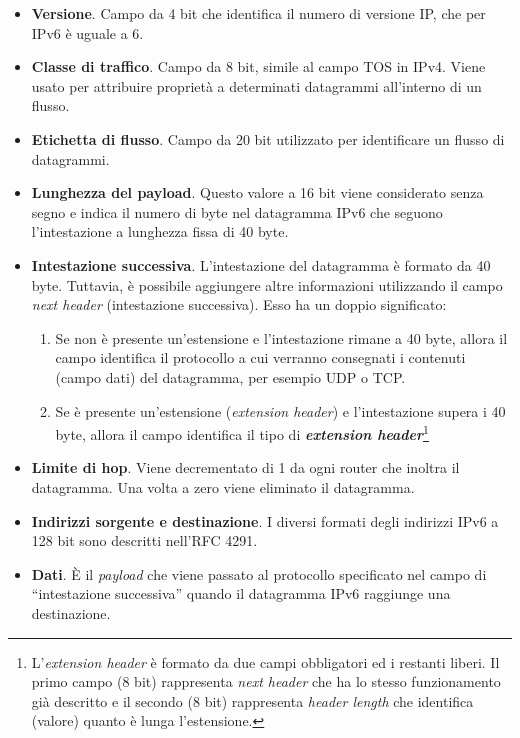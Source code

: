 \documentclass[a4paper]{article}
\newcommand{\dquotes}[1]{``#1''}
\begin{document}
	\begin{itemize}
		\item \textbf{Versione}. Campo da 4 bit che identifica il numero di versione IP, che per IPv6 è uguale a 6.
		
		\item \textbf{Classe di traffico}. Campo da 8 bit, simile al campo \textsf{TOS} in IPv4. Viene usato per attribuire proprietà a determinati datagrammi all'interno di un flusso.
		
		\item \textbf{Etichetta di flusso}. Campo da 20 bit utilizzato per identificare un flusso di datagrammi.
		
		\item \textbf{Lunghezza del payload}. Questo valore a 16 bit viene considerato senza segno e indica il numero di byte nel datagramma IPv6 che seguono l'intestazione a lunghezza fissa di 40 byte.
		
		\item \textbf{Intestazione successiva}. L'intestazione del datagramma è formato da 40 byte. Tuttavia, è possibile aggiungere altre informazioni utilizzando il campo \emph{next header} (intestazione successiva). Esso ha un doppio significato:
		\begin{enumerate}
			\item Se non è presente un'estensione e l'intestazione rimane a 40 byte, allora il campo identifica il protocollo a cui verranno consegnati i contenuti (campo dati) del datagramma, per esempio \textsf{UDP} o \textsf{TCP}.
			
			\item Se è presente un'estensione (\emph{extension header}) e l'intestazione supera i 40 byte, allora il campo identifica il tipo di \textbf{\emph{extension header}}\footnote{L'\emph{extension header} è formato da due campi obbligatori ed i restanti liberi. Il primo campo (8 bit) rappresenta \emph{next header} che ha lo stesso funzionamento già descritto e il secondo (8 bit) rappresenta \emph{header length} che identifica (valore) quanto è lunga l'estensione.}
		\end{enumerate}
		
		\item \textbf{Limite di hop}. Viene decrementato di 1 da ogni router che inoltra il datagramma. Una volta a zero viene eliminato il datagramma.
		
		\item \textbf{Indirizzi sorgente e destinazione}. I diversi formati degli indirizzi IPv6 a 128 bit sono descritti nell'RFC 4291.
		
		\item \textbf{Dati}. È il \emph{payload} che viene passato al protocollo specificato nel campo di \dquotes{intestazione successiva} quando il datagramma IPv6 raggiunge una destinazione.
	\end{itemize}\newpage
\end{document}
